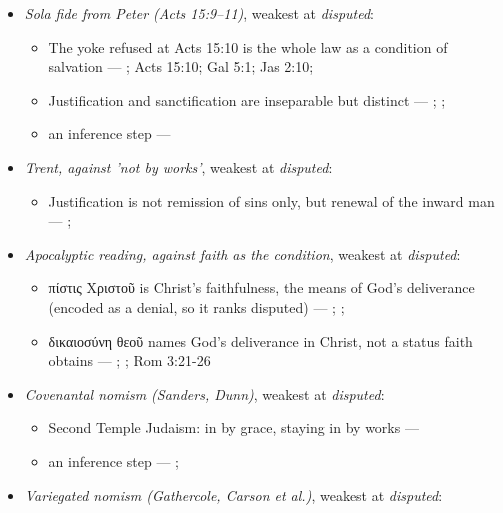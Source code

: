 \documentclass[11pt]{article}
\begin{document}
\begin{itemize}
\item \emph{Sola fide from Peter (Acts 15:9–11)}, weakest at \emph{disputed}:
\begin{itemize}
\item The yoke refused at Acts 15:10 is the whole law as a condition of salvation --- \cite[ad loc. Acts 15:10]{bruce-acts-1988}; Acts 15:10; Gal 5:1; Jas 2:10; \cite{das-paul-law-covenant-2001}
\item Justification and sanctification are inseparable but distinct --- \cite[XIII.1]{westminster-confession-1647}; \cite[XI.1]{westminster-confession-1647}; \cite[III.xi.6]{calvin-institutes-1960}
\item an inference step --- \cite[Trent, Session VI (1547), canon 9]{tanner-decrees-1990}
\end{itemize}
\item \emph{Trent, against 'not by works'}, weakest at \emph{disputed}:
\begin{itemize}
\item Justification is not remission of sins only, but renewal of the inward man --- \cite[Trent, Session VI (1547), Decree on Justification, ch. 7]{tanner-decrees-1990}; \cite[Trent, Session VI (1547), canon 11]{tanner-decrees-1990}
\end{itemize}
\item \emph{Apocalyptic reading, against faith as the condition}, weakest at \emph{disputed}:
\begin{itemize}
\item πίστις Χριστοῦ is Christ's faithfulness, the means of God's deliverance (encoded as a denial, so it ranks disputed) --- \cite{campbell-deliverance-god-2009}; \cite[ad loc. Gal 2:16]{martyn-galatians-1997}; \cite{hays-faith-jesus-christ-2002}
\item δικαιοσύνη θεοῦ names God's deliverance in Christ, not a status faith obtains --- \cite{campbell-deliverance-god-2009}; \cite{martyn-galatians-1997}; Rom 3:21-26
\end{itemize}
\item \emph{Covenantal nomism (Sanders, Dunn)}, weakest at \emph{disputed}:
\begin{itemize}
\item Second Temple Judaism: in by grace, staying in by works --- \cite{sanders-paul-palestinian-judaism-1977}
\item an inference step --- \cite{dunn-new-perspective-2005}; \cite{wright-what-paul-said-1997}
\end{itemize}
\item \emph{Variegated nomism (Gathercole, Carson et al.)}, weakest at \emph{disputed}:

\end{itemize}
\end{document}
